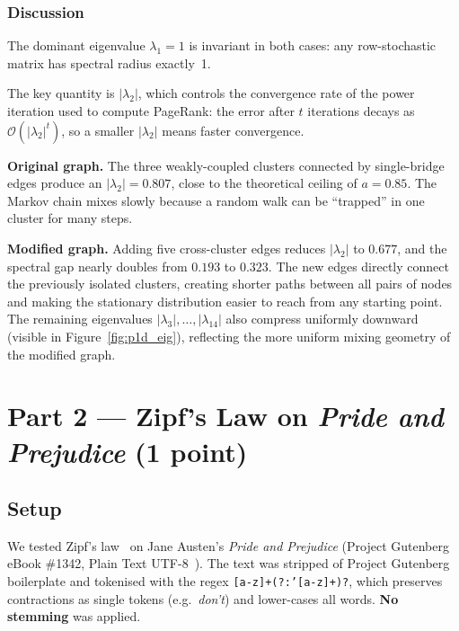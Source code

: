 \documentclass[12pt, a4paper]{article}
\begin{document}
\subsubsection*{Discussion}

The dominant eigenvalue $\lambda_1 = 1$ is invariant in both cases: any
row-stochastic matrix has spectral radius exactly~1.

The key quantity is $|\lambda_2|$, which controls the convergence rate of the
power iteration used to compute PageRank: the error after $t$ iterations
decays as $\mathcal{O}(|\lambda_2|^t)$, so a smaller $|\lambda_2|$ means
faster convergence.

\textbf{Original graph.} The three weakly-coupled clusters connected by
single-bridge edges produce an $|\lambda_2| = 0.807$, close to the theoretical
ceiling of $a = 0.85$. The Markov chain mixes slowly because a random walk
can be ``trapped'' in one cluster for many steps.

\textbf{Modified graph.} Adding five cross-cluster edges reduces
$|\lambda_2|$ to $0.677$, and the spectral gap nearly doubles from $0.193$
to $0.323$.  The new edges directly connect the previously
isolated clusters, creating shorter paths between all pairs of nodes and
making the stationary distribution easier to reach from any starting point.
The remaining eigenvalues $|\lambda_3|, \dots, |\lambda_{14}|$ also
compress uniformly downward (visible in Figure~\ref{fig:p1d_eig}), reflecting
the more uniform mixing geometry of the modified graph.

\section{Part 2 — Zipf's Law on \textit{Pride and Prejudice} (1 point)}

\subsection{Setup}

We tested Zipf's law~\cite{zipf1949} on Jane Austen's
\textit{Pride and Prejudice} (Project Gutenberg eBook \#1342,
Plain Text UTF-8~\cite{gutenberg1342}).
The text was stripped of Project Gutenberg boilerplate and tokenised
with the regex \texttt{[a-z]+(?:'[a-z]+)?}, which preserves contractions
as single tokens (e.g.\ \textit{don't}) and lower-cases all words.
\textbf{No stemming} was applied.
\end{document}

